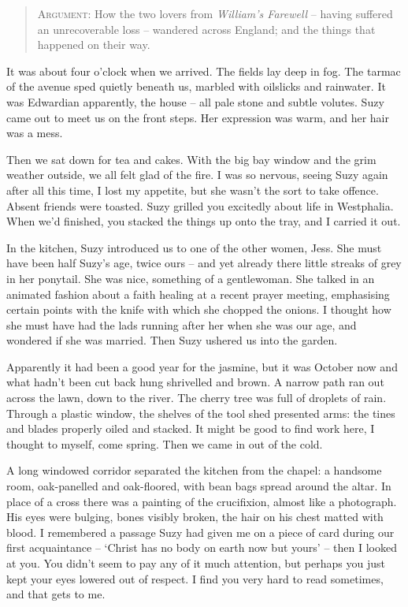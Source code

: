 \documentclass{amsbook}
\begin{document}
    \begin{quote}
        {\footnotesize \textsc{Argument:} How the two lovers from \textit{William's Farewell} -- having suffered an unrecoverable loss -- wandered across England; and the things that happened on their way.}
    \end{quote}
    \bigskip

    \noindent It was about four o'clock when we arrived. The fields lay deep in fog. The tarmac of the avenue sped quietly beneath us, marbled with oilslicks and rainwater. It was Edwardian apparently, the house -- all pale stone and subtle volutes. Suzy came out to meet us on the front steps. Her expression was warm, and her hair was a mess.

Then we sat down for tea and cakes. With the big bay window and the grim weather outside, we all felt glad of the fire. I was so nervous, seeing Suzy again after all this time, I lost my appetite, but she wasn't the sort to take offence. Absent friends were toasted. Suzy grilled you excitedly about life in Westphalia. When we'd finished, you stacked the things up onto the tray, and I carried it out.

In the kitchen, Suzy introduced us to one of the other women, Jess. She must have been half Suzy's age, twice ours -- and yet already there little streaks of grey in her ponytail. She was nice, something of a gentlewoman. She talked in an animated fashion about a faith healing at a recent prayer meeting, emphasising certain points with the knife with which she chopped the onions. I thought how she must have had the lads running after her when she was our age, and wondered if she was married. Then Suzy ushered us into the garden.

Apparently it had been a good year for the jasmine, but it was October now and what hadn't been cut back hung shrivelled and brown. A narrow path ran out across the lawn, down to the river. The cherry tree was full of droplets of rain. Through a plastic window, the shelves of the tool shed presented arms: the tines and blades properly oiled and stacked. It might be good to find work here, I thought to myself, come spring. Then we came in out of the cold.

A long windowed corridor separated the kitchen from the chapel: a handsome room, oak-panelled and oak-floored, with bean bags spread around the altar. In place of a cross there was a painting of the crucifixion, almost like a photograph. His eyes were bulging, bones visibly broken, the hair on his chest matted with blood. I remembered a passage Suzy had given me on a piece of card during our first acquaintance -- `Christ has no body on earth now but yours' -- then I looked at you. You didn't seem to pay any of it much attention, but perhaps you just kept your eyes lowered out of respect. I find you very hard to read sometimes, and that gets to me.
\end{document}
